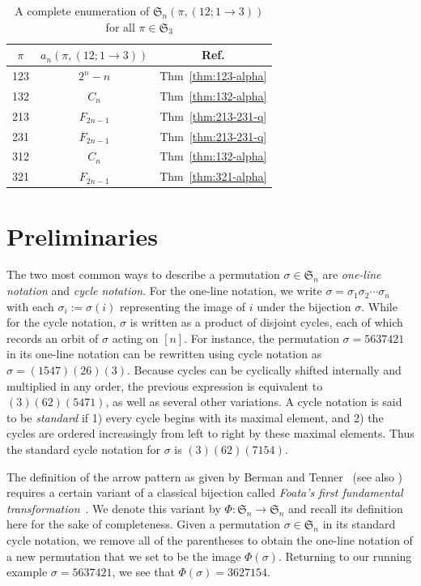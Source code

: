 \documentclass[12pt]{amsart}
\numberwithin{equation}{section}
\theoremstyle{plain}
\def\fS{\mathfrak{S}}
\begin{document}
	\begin{table}[h]
    \renewcommand{\arraystretch}{1.2}
    \centering
	\begin{tabular}{|c|c|c|}
	\hline
	$\pi$ & $a_n(\pi,(12;1\to 3))$ & Ref. \\
	\hline
	123 & $2^n-n$ & Thm~\ref{thm:123-alpha}\\
	132 & $C_n$ & Thm~\ref{thm:132-alpha} \\
	213 & $F_{2n-1}$ & Thm~\ref{thm:213-231-q}\\
	231 & $F_{2n-1}$ & Thm~\ref{thm:213-231-q} \\
	312 & $C_n$ & Thm~\ref{thm:132-alpha}\\
	321 & $F_{2n-1}$ & Thm~\ref{thm:321-alpha} \\
	\hline
	\end{tabular}
	\medskip
	\caption{A complete enumeration of $\fS_n(\pi,(12;1\to 3))$ for all $\pi\in\fS_3$}\label{tab:3-alpha all}
	\end{table}
		
	

	\section{Preliminaries}\label{sec:preliminaries}

	The two most common ways to describe a permutation $\sigma\in\fS_n$ are \emph{one-line notation} and \emph{cycle notation}. For the one-line notation, we write $\sigma=\sigma_1\sigma_2\cdots\sigma_n$ with each $\sigma_i:=\sigma(i)$ representing the image of $i$ under the bijection $\sigma$. While for the cycle notation, $\sigma$ is written as a product of disjoint cycles, each of which records an orbit of $\sigma$ acting on $[n]$. For instance, the permutation $\sigma=5637421$ in its one-line notation can be rewritten using cycle notation as $\sigma=(1547)(26)(3)$. Because cycles can be cyclically shifted internally and multiplied in any order, the previous expression is equivalent to $(3)(62)(5471)$, as well as several other variations. A cycle notation is said to be \emph{standard} if 1) every cycle begins with its maximal element, and 2) the cycles are ordered increasingly from left to right by these maximal elements. Thus the standard cycle notation for $\sigma$ is $(3)(62)(7154)$.

	The definition of the arrow pattern as given by Berman and Tenner~\cite[Defn.~17]{BT2022} (see also \cite[Section 2]{AL2026}) requires a certain variant of a classical bijection called \emph{Foata's first fundamental transformation}~\cite[Chapter 10.2]{Lot1997}. We denote this variant by $\Phi: \fS_n\to \fS_n$ and recall its definition here for the sake of completeness. Given a permutation $\sigma\in\fS_n$ in its standard cycle notation, we remove all of the parentheses to obtain the one-line notation of a new permutation that we set to be the image $\Phi(\sigma)$. Returning to our running example $\sigma=5637421$, we see that $\Phi(\sigma)=3627154$.
\end{document}
